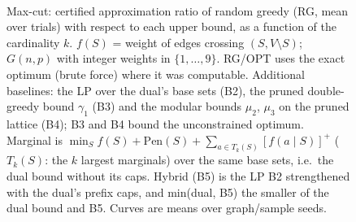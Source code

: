 \begin{figure}[t]
\centering
\setlength{\rgplotwidth}{0.245\textwidth}
\\[1pt]

\caption{Max-cut: certified approximation ratio of random greedy (RG, mean over trials) with respect to each upper bound, as a function of the cardinality $k$. $f(S)$ = weight of edges crossing $(S, V\setminus S)$; $G(n,p)$ with integer weights in $\{1,\dots,9\}$. RG/OPT uses the exact optimum (brute force) where it was computable. Additional baselines: the LP over the dual's base sets (B2), the pruned double-greedy bound $\gamma_1$ (B3) and the modular bounds $\mu_2$, $\mu_3$ on the pruned lattice (B4); B3 and B4 bound the unconstrained optimum. Marginal is $\min_S f(S)+\mathrm{Pen}(S)+\sum_{a\in T_k(S)}[f(a\mid S)]^+$ ($T_k(S)$: the $k$ largest marginals) over the same base sets, i.e.\ the dual bound without its caps. Hybrid (B5) is the LP B2 strengthened with the dual's prefix caps, and min(dual, B5) the smaller of the dual bound and B5. Curves are means over graph/sample seeds.}
\label{fig:rg-max_cut-wide-hybrid}
\end{figure}
